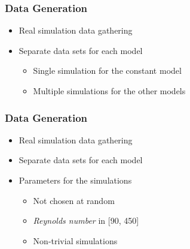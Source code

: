 \documentclass[18pt, xcolor=table]{beamer}
\begin{document}
\begin{frame}[t]
  \frametitle{Data Generation}
  \begin{itemize}
  \item Real simulation data gathering
  \item Separate data sets for each model
    \begin{itemize}
    \item Single simulation for the constant model
    \item Multiple simulations for the other models
    \end{itemize}
  \end{itemize}
\end{frame}

\begin{frame}[t]
  \frametitle{Data Generation}
  \begin{itemize}
  \item Real simulation data gathering
  \item Separate data sets for each model
  \item Parameters for the simulations
    \begin{itemize}
    \item Not chosen at random
    \item \textit{Reynolds number} in [90, 450]
    \item Non-trivial simulations
    \end{itemize}
  \end{itemize}
\end{frame}
\end{document}
